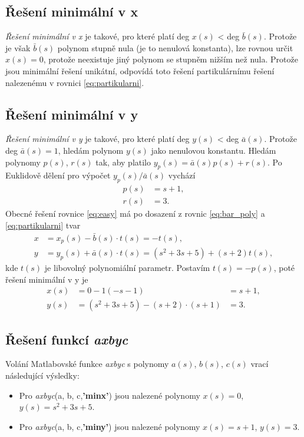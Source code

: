 \documentclass[twoside]{article}
\begin{document}
\subsection{Řešení minimální v x}
\textit{Řešení minimální v x} je takové, pro které platí deg $x(s)$ < deg $\bar{b}(s)$. Protože je však $\bar{b}(s)$
polynom stupně nula (je to nenulová konstanta), lze rovnou určit $x(s) = 0$, protože neexistuje jiný polynom se stupněm nižším než nula.
Protože jsou minimální řešení unikátní, odpovídá toto řešení partikulárnímu řešení nalezenému v rovnici \eqref{eq:partikularni}.

\subsection{Řešení minimální v y}
\textit{Řešení minimální v y} je takové, pro které platí deg $y(s)$ < deg $\bar{a}(s)$. Protože deg $\bar{a}(s) = 1$,
hledám polynom $y(s)$ jako nenulovou konstantu. Hledám polynomy $p(s)$, $r(s)$ tak, aby platilo $y_p(s) = \bar{a}(s)p(s) + r(s)$.
Po Euklidově dělení pro výpočet $y_p(s)/\bar{a}(s)$ vychází
\begin{equation}
	\begin{aligned}
		p(s) &= s+1, \\
		r(s) &= 3.
	\end{aligned}
\end{equation}
Obecné řešení rovnice \eqref{eq:easy} má po dosazení z rovnic \eqref{eq:bar_poly} a \eqref{eq:partikularni} tvar
\begin{equation}
	\begin{aligned}
		x &= x_p(s) - \bar{b}(s) \cdot t(s) = - t(s), \\
		y &= y_p(s) + \bar{a}(s) \cdot t(s) = (s^2 + 3s + 5) + (s+2)t(s),
	\end{aligned}
	\label{eq:obecne_reseni}
\end{equation}
kde $t(s)$ je libovolný polynomiální parametr. Postavím $t(s) = -p(s)$, poté řešení minimální v y je
\begin{equation}
	\begin{aligned}
		x(s) &= 0 - 1 (-s-1) &= s+1, \\
		y(s) &= (s^2 + 3s +5) - (s+2) \cdot (s+1) &= 3.
	\end{aligned}
	\label{eq:minimalni_y}
\end{equation}

\subsection{Řešení funkcí \textit{axbyc}}
Volání Matlabovské funkce \textit{axbyc} s polynomy $a(s)$, $b(s)$, $c(s)$ vrací následující výsledky:
\begin{itemize}
	\item Pro \textit{axbyc}(a, b, c,\textbf{'minx'}) jsou nalezené polynomy $x(s) = 0$, $y(s) = s^2 + 3s + 5$.
	\item Pro \textit{axbyc}(a, b, c,\textbf{'miny'}) jsou nalezené polynomy $x(s) = s+1$, $y(s) = 3$.
\end{itemize}
\end{document}
